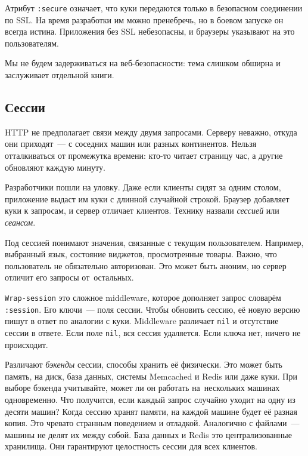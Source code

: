 Атрибут \verb|:secure| означает, что куки передаются только в безопасном
соединении по SSL. На время разработки им можно пренебречь, но в боевом запуске
он всегда истина. Приложения без SSL небезопасны, и браузеры указывают на это
пользователям.

Мы не будем задерживаться на веб-безопасности: тема слишком обширна и
заслуживает отдельной книги.

\subsection{Сессии}


HTTP не предполагает связи между двумя запросами. Серверу неважно, откуда они
приходят~--- с соседних машин или разных континентов. Нельзя отталкиваться от
промежутка времени: кто-то читает страницу час, а другие обновляют каждую
минуту.

Разработчики пошли на уловку. Даже если клиенты сидят за одним столом,
приложение выдаст им куки с длинной случайной строкой. Браузер добавляет куки к
запросам, и сервер отличает клиентов. Технику назвали \emph{сессией} или
\emph{сеансом}.

Под сессией понимают значения, связанные с текущим пользователем. Например,
выбранный язык, состояние виджетов, просмотренные товары. Важно, что
пользователь не обязательно авторизован. Это может быть аноним, но сервер
отличит его запросы от~остальных.


\verb|Wrap-session| это сложное middleware, которое дополняет запрос словарём
\verb|:session|. Его ключи~--- поля сессии. Чтобы обновить сессию, её новую
версию пишут в ответ по аналогии с куки. Middleware различает \verb|nil| и
отсутствие сессии в ответе. Если поле \verb|nil|, вся сессия удаляется. Если
ключа нет, ничего не происходит.


Различают \emph{бэкенды} сессии, способы хранить её физически. Это может
быть память, на диск, база данных, системы Memcached и Redis или даже куки. При
выборе бэкенда учитывайте, может ли он работать на~нескольких машинах
одновременно. Что получится, если каждый запрос случайно уходит на одну из
десяти машин? Когда сессию хранят памяти, на каждой машине будет её разная
копия. Это чревато странным поведением и отладкой. Аналогично с файлами~---
машины не делят их между собой. База данных и Redis это централизованные
хранилища. Они гарантируют целостность сессии для всех клиентов.

